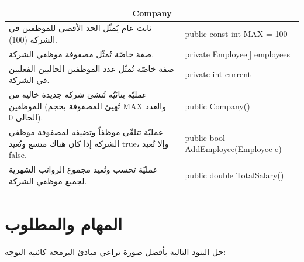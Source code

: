 \documentclass[14pt]{extarticle}
\begin{document}
\begin{center}
\renewcommand{\arraystretch}{1.5}
{\small
\begin{tabular}{|p{}|p{}|}
\hline
\multicolumn{2}{|c|}{\textbf{\textenglish{Company}}} \\
\hline
ثابت عام يُمثّل الحد الأقصى للموظفين في الشركة (100). & \textenglish{public const int MAX = 100} \\
\hline
صفة خاصّة تُمثّل مصفوفة موظفي الشركة. & \textenglish{private Employee[] employees} \\
\hline
صفة خاصّة تُمثّل عدد الموظفين الحاليين الفعليين في الشركة. & \textenglish{private int current} \\
\hline
عمليّة بنائيّة تُنشئ شركة جديدة خالية من الموظفين (تُهيئ المصفوفة بحجم \textenglish{MAX} والعدد الحالي 0). & \textenglish{public Company()} \\
\hline
عمليّة تتلقّى موظفاً وتضيفه لمصفوفة موظفي الشركة إذا كان هناك متسع وتُعيد \textenglish{true}، وإلا تُعيد \textenglish{false}. & \textenglish{public bool AddEmployee(Employee e)} \\
\hline
عمليّة تحسب وتُعيد مجموع الرواتب الشهرية لجميع موظفي الشركة. & \textenglish{public double TotalSalary()} \\
\hline
\end{tabular}
}
\end{center}

\clearpage

\section*{المهام والمطلوب}

حل البنود التالية بأفضل صورة تراعي مبادئ البرمجة كائنية التوجه:
\end{document}
